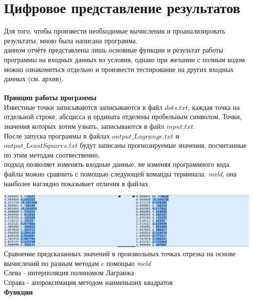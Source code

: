 \documentclass[a4paper, 14pt]{extreport}
\begin{document}
\section*{Цифровое представление результатов}
\;\;\;\;\;\;Для того, чтобы произвести необходимые вычисления и проанализировать результаты, мною была написана программа. \\ 
 данном отчёте представлены лишь основные функции и результат работы программы на входных данных из условия, однако при желании с полным кодом можно ознакомиться отдельно и произвести тестирование на других входных данных (см. архив).\\
\\
\indent\textbf{Принцип работы программы} \\
\indent Известные точки записываются записываются в файл $dots.txt$, каждая точка на отдельной строке, абсцисса и ордината отделены пробельным символом. Точки, значения которых хотим узнать, записываются в файл $input.txt$. \\ \indent После запуска программы в файлах $output\_Lagrange.txt$ и \\ $output\_LeastSquares.txt$ будут записаны прогнозируемые значения, посчитанные по этим методам соотвественно. \\
 подход позволяет изменять входные данные, не изменяя программного кода.
\\  файлы можно сравнить с помощью следующей команды терминала: \textit{meld}, она наиболее наглядно показывает отличия в файлах.

\noindent\includegraphics[width =\textwidth]{meld}
Сравнение предсказанных значений в произвольных точках отрезка на основе вычислений по разным методам c помощью \textit{meld}\\
Слева - интерполяция полиномом Лагранжа \\
Справа - аппроксимация методом наименьших квадратов \\

\indent \textbf{Функции} \\
\end{document}
